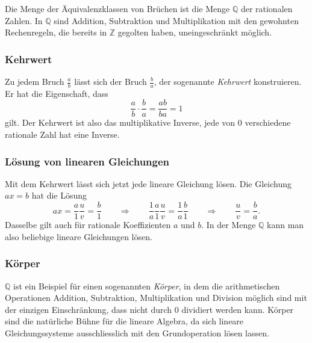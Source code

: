 Die Menge der Äquivalenzklassen von Brüchen ist die Menge $\mathbb{Q}$
der rationalen Zahlen.
In $\mathbb{Q}$ sind Addition, Subtraktion und Multiplikation mit den
gewohnten Rechenregeln, die bereits in $\mathbb{Z}$ gegolten haben,
uneingeschränkt möglich.

\subsubsection{Kehrwert}
Zu jedem Bruch $\frac{a}{b}$ lässt sich der Bruch $\frac{b}{a}$,
der sogenannte {\em Kehrwert}
konstruieren.
Er hat die Eigenschaft, dass
\[
\frac{a}{b}\cdot\frac{b}{a}
=
\frac{ab}{ba}
=
1
\]
gilt.
Der Kehrwert ist also das multiplikative Inverse, jede von $0$ verschiedene
rationale Zahl hat eine Inverse.

\subsubsection{Lösung von linearen Gleichungen}
Mit dem Kehrwert lässt sich jetzt jede lineare Gleichung lösen.
Die Gleichung $ax=b$ hat die Lösung
\[
ax = \frac{a}{1} \frac{u}{v} = \frac{b}{1}
\qquad\Rightarrow\qquad
\frac{1}{a}
 \frac{a}{1} \frac{u}{v} = \frac{1}{a}\frac{b}{1} 
\qquad\Rightarrow\qquad
\frac{u}{v} = \frac{b}{a}.
\]
Dasselbe gilt auch für rationale Koeffizienten $a$ und $b$.
In der Menge $\mathbb{Q}$ kann man also beliebige lineare Gleichungen
lösen.

\subsubsection{Körper}
$\mathbb{Q}$ ist ein Beispiel für einen sogenannten {\em Körper}, 
in dem die arithmetischen Operationen Addition, Subtraktion, Multiplikation
und Division möglich sind mit der einzigen Einschränkung, dass nicht durch
$0$ dividiert werden kann.
Körper sind die natürliche Bühne für die lineare Algebra, da sich lineare
Gleichungssysteme ausschliesslich mit den Grundoperation lösen lassen.

